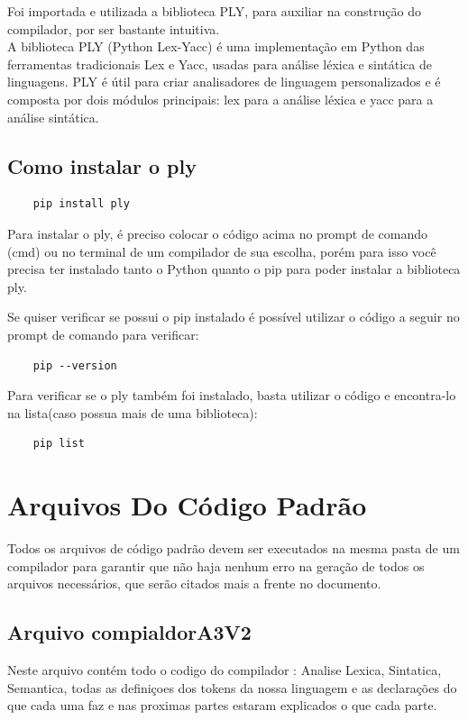\documentclass[a4paper,12pt]{article}
\begin{document}
Foi importada e utilizada a biblioteca PLY, para auxiliar na construção 
do compilador, por ser bastante intuitiva.\\

A biblioteca PLY (Python Lex-Yacc) é uma implementação em Python das 
ferramentas tradicionais Lex e Yacc, usadas para análise léxica e 
sintática de linguagens. PLY é útil para criar analisadores de linguagem 
personalizados e é composta por dois módulos principais: lex para a 
análise léxica e yacc para a análise sintática.

\subsection{Como instalar o ply}
\begin{verbatim}
    pip install ply
\end{verbatim}
Para instalar o ply, é preciso colocar o código acima no prompt de comando (cmd) ou no terminal de um compilador de sua escolha, porém para isso você precisa ter instalado tanto o Python quanto o pip para poder instalar a biblioteca ply. 

Se quiser verificar se possui o pip instalado é possível utilizar o código a seguir no prompt de comando para verificar: 

\begin{verbatim}
    pip --version
\end{verbatim}

Para verificar se o ply também foi instalado, basta utilizar o código e encontra-lo na lista(caso possua mais de uma biblioteca): 
\begin{verbatim}
    pip list
\end{verbatim}

\section{Arquivos Do Código Padrão}
Todos os arquivos de código padrão devem ser executados na mesma pasta de um compilador para garantir que não haja nenhum erro na geração de todos os arquivos necessários, que serão citados mais a frente no documento. 

\subsection{Arquivo compialdorA3V2}
Neste arquivo contém todo o codigo do compilador : Analise Lexica, 
Sintatica, Semantica, todas as definiçoes dos tokens da nossa linguagem 
e as declarações do que cada uma faz e nas proximas partes estaram 
explicados o que cada parte.
\end{document}
